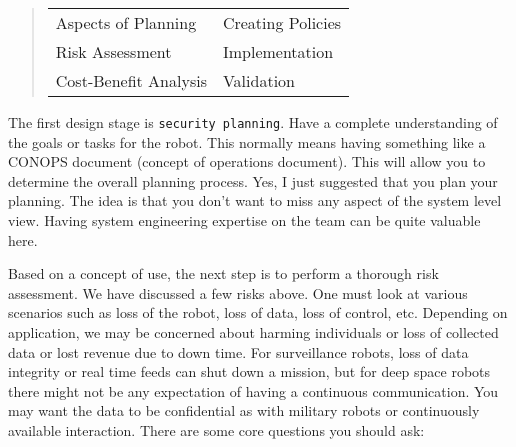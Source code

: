 \begin{quote}
\begin{longtable}[]{@{}ll@{}}
\toprule
\endhead
\begin{minipage}[t]{0.30\columnwidth}\raggedright
Aspects of Planning\strut
\end{minipage} & \begin{minipage}[t]{0.30\columnwidth}\raggedright
Creating Policies\strut
\end{minipage}\tabularnewline
\begin{minipage}[t]{0.30\columnwidth}\raggedright
Risk Assessment\strut
\end{minipage} & \begin{minipage}[t]{0.30\columnwidth}\raggedright
Implementation\strut
\end{minipage}\tabularnewline
\begin{minipage}[t]{0.30\columnwidth}\raggedright
Cost-Benefit Analysis\strut
\end{minipage} & \begin{minipage}[t]{0.30\columnwidth}\raggedright
Validation\strut
\end{minipage}\tabularnewline
\bottomrule
\end{longtable}
\end{quote}

The first design stage is \texttt{security\ planning}. Have a complete
understanding of the goals or tasks for the robot. This normally means
having something like a CONOPS document (concept of operations
document). This will allow you to determine the overall planning
process. Yes, I just suggested that you plan your planning. The idea is
that you don't want to miss any aspect of the system level view. Having
system engineering expertise on the team can be quite valuable here.

Based on a concept of use, the next step is to perform a thorough risk
assessment. We have discussed a few risks above. One must look at
various scenarios such as loss of the robot, loss of data, loss of
control, etc. Depending on application, we may be concerned about
harming individuals or loss of collected data or lost revenue due to
down time. For surveillance robots, loss of data integrity or real time
feeds can shut down a mission, but for deep space robots there might not
be any expectation of having a continuous communication. You may want
the data to be confidential as with military robots or continuously
available interaction. There are some core questions you should ask:

